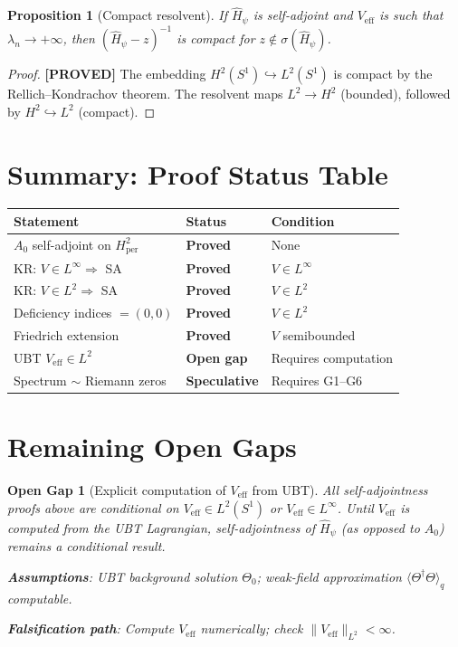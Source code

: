 \documentclass[11pt,a4paper]{article}
\newtheorem{proposition}{Proposition}
\newtheorem{gap}{Open Gap}
\newcommand{\proved}[1]{\textbf{[PROVED]} #1}
\begin{document}
\begin{proposition}[Compact resolvent]
  If $\hat{H}_\psi$ is self-adjoint and $V_\mathrm{eff}$ is such that
  $\lambda_n \to +\infty$, then $(\hat{H}_\psi - z)^{-1}$ is compact
  for $z \notin \sigma(\hat{H}_\psi)$.
\end{proposition}

\begin{proof}
  \proved{The embedding $H^2(S^1) \hookrightarrow L^2(S^1)$ is compact by
  the Rellich--Kondrachov theorem.  The resolvent maps $L^2 \to H^2$
  (bounded), followed by $H^2 \hookrightarrow L^2$ (compact).}
\end{proof}

\section{Summary: Proof Status Table}

\begin{center}
\begin{tabular}{lll}
\hline
Statement & Status & Condition \\
\hline
$A_0$ self-adjoint on $H^2_\mathrm{per}$ & \textbf{Proved} & None \\
KR: $V \in L^\infty \Rightarrow$ SA & \textbf{Proved} & $V \in L^\infty$ \\
KR: $V \in L^2 \Rightarrow$ SA & \textbf{Proved} & $V \in L^2$ \\
Deficiency indices $= (0,0)$ & \textbf{Proved} & $V \in L^2$ \\
Friedrich extension & \textbf{Proved} & $V$ semibounded \\
UBT $V_\mathrm{eff} \in L^2$ & \textbf{Open gap} & Requires computation \\
Spectrum $\sim$ Riemann zeros & \textbf{Speculative} & Requires G1--G6 \\
\hline
\end{tabular}
\end{center}

\section{Remaining Open Gaps}

\begin{gap}[Explicit computation of $V_\mathrm{eff}$ from UBT]
  All self-adjointness proofs above are \emph{conditional} on
  $V_\mathrm{eff} \in L^2(S^1)$ or $V_\mathrm{eff} \in L^\infty$.
  Until $V_\mathrm{eff}$ is computed from the UBT Lagrangian, self-adjointness
  of $\hat{H}_\psi$ (as opposed to $A_0$) remains a conditional result.

  \textbf{Assumptions}: UBT background solution $\Theta_0$; weak-field
  approximation $\langle\Theta^\dagger\Theta\rangle_q$ computable.

  \textbf{Falsification path}: Compute $V_\mathrm{eff}$ numerically;
  check $\|V_\mathrm{eff}\|_{L^2} < \infty$.
\end{gap}
\end{document}
